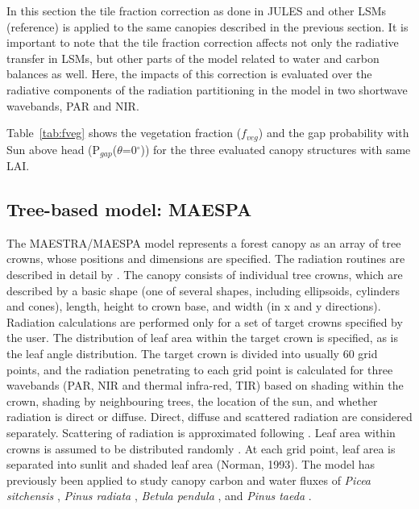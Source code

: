 \documentclass[a4paper,11pt]{report}
\begin{document}
In this section the tile fraction correction as done in JULES and other LSMs (reference) is applied to the same canopies described in the previous section. It is important to note that the tile fraction correction affects not only the radiative transfer in LSMs, but other parts of the model related to water and carbon balances as well. Here, the impacts of this correction is evaluated over the radiative components of the radiation partitioning in the model in two shortwave wavebands, PAR and NIR.

Table~\ref{tab:fveg} shows the vegetation fraction ($f_{veg}$) and the gap probability with Sun above head (P$_{gap}$($\theta$=0$^{\circ}$)) for the three evaluated canopy structures with same LAI. 

\subsection{Tree-based model: MAESPA}\label{section:maespa}
The MAESTRA/MAESPA model \citep{Wang1990,Medlyn2004,Medlyn2007,Duursma2012} represents a forest canopy as an array of tree crowns, whose positions and dimensions are specified. The radiation routines are described in detail by \citet{Wang1990}. The canopy consists of individual tree crowns, which are described by a basic shape (one of several shapes, including ellipsoids, cylinders and cones), length, height to crown base, and width (in x and y directions). Radiation calculations are performed only for a set of target crowns specified by the user. The distribution of leaf area within the target crown is specified, as is the leaf angle distribution. The target crown is divided into usually 60 grid points, and the radiation penetrating to each grid point is calculated for three wavebands (PAR, NIR and thermal infra-red, TIR) based on shading within the crown, shading by neighbouring trees, the location of the sun, and whether radiation is direct or diffuse. Direct, diffuse and scattered radiation are considered separately. Scattering of radiation is approximated following \citet{Norman1979}. Leaf area within crowns is assumed to be distributed randomly \citep{Wang1990}. At each grid point, leaf area is separated into sunlit and shaded leaf area (Norman, 1993). The model has previously been applied to study canopy carbon and water fluxes of \textit{Picea sitchensis} \citep{Wang1990}, \textit{Pinus radiata} \citep{McMurtrie1993}, \textit{Betula pendula} \citep{Wang1998}, and \textit{Pinus taeda} \citep{Luo2001}. 
\end{document}

